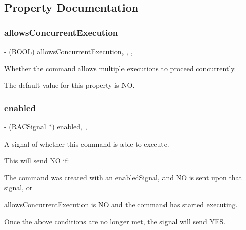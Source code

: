 \subsection{Property Documentation}
\mbox{\label{interface_r_a_c_command_a303b2d58c44d1d82e07a56fbd307f84a}} 
\subsubsection{\texorpdfstring{allows\+Concurrent\+Execution}{allowsConcurrentExecution}}
{\footnotesize\ttfamily -\/ (B\+O\+OL) allows\+Concurrent\+Execution\hspace{0.3cm}{\ttfamily [read]}, {\ttfamily [write]}, {\ttfamily [atomic]}, {\ttfamily [assign]}}

Whether the command allows multiple executions to proceed concurrently.

The default value for this property is NO. \mbox{\label{interface_r_a_c_command_a34d3f1914d4599329c0077690a0872ab}} 
\subsubsection{\texorpdfstring{enabled}{enabled}}
{\footnotesize\ttfamily -\/ (\mbox{\hyperlink{interface_r_a_c_signal}{R\+A\+C\+Signal}} $\ast$) enabled\hspace{0.3cm}{\ttfamily [read]}, {\ttfamily [nonatomic]}, {\ttfamily [strong]}}

A signal of whether this command is able to execute.

This will send NO if\+:


\begin{DoxyItemize}
\item The command was created with an {\ttfamily enabled\+Signal}, and NO is sent upon that signal, or
\item {\ttfamily allows\+Concurrent\+Execution} is NO and the command has started executing.
\end{DoxyItemize}

Once the above conditions are no longer met, the signal will send Y\+ES.

